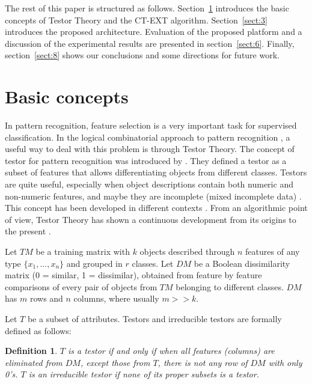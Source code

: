 \documentclass[authoryear,preprint,review,12pt]{elsarticle}
\newtheorem{definition}{Definition}
\begin{document}

The rest of this paper is structured as follows. Section~\ref{sect:2} introduces the basic concepts of 
Testor Theory and the CT-EXT algorithm. Section~\ref{sect:3} introduces the proposed architecture.  
Evaluation of the proposed platform and a discussion of the experimental results are 
presented in section~\ref{sect:6}. Finally, section~\ref{sect:8} shows our conclusions and some directions 
for future work.

\section{Basic concepts}
\label{sect:2}

In pattern recognition, feature selection is a very important task for supervised classification. In the logical
 combinatorial approach to pattern recognition \citep{R5}, a useful
way to deal with this problem is through Testor Theory. The concept of testor for pattern recognition was
introduced by \cite{R12}. They defined a testor as a subset of features that allows
differentiating objects from different classes. Testors are quite useful, especially when object descriptions
contain both numeric and non-numeric features, and maybe they are incomplete (mixed incomplete data)
\citep{R5}. This concept has been developed in different contexts \citep{R1}. From an 
algorithmic point of view, Testor Theory has shown a continuous development from its origins to the present 
\citep{R31,R13,R23}.

Let $TM$ be a training matrix with $k$ objects described through $n$
features of any type $\{x_{1},\ldots,x_{n}\}$ and grouped in $r$
classes. Let $DM$ be a Boolean dissimilarity matrix (0 = similar, 1 =
dissimilar), obtained from feature by feature comparisons of every
pair of objects from $TM$ belonging to different classes. $DM$ has
$m$ rows and $n$ columns, where usually $m>>k$.

Let $T$ be a subset of attributes. Testors and irreducible testors are formally defined as follows:

\begin{definition} \label{def1}
$T$ is a testor if and only if when all
features (columns) are eliminated from $DM$, except those from $T$, there is
not any row of $DM$ with only 0's. $T$ is an irreducible testor if none of its proper subsets is a testor.
\end{definition}
\end{document}
